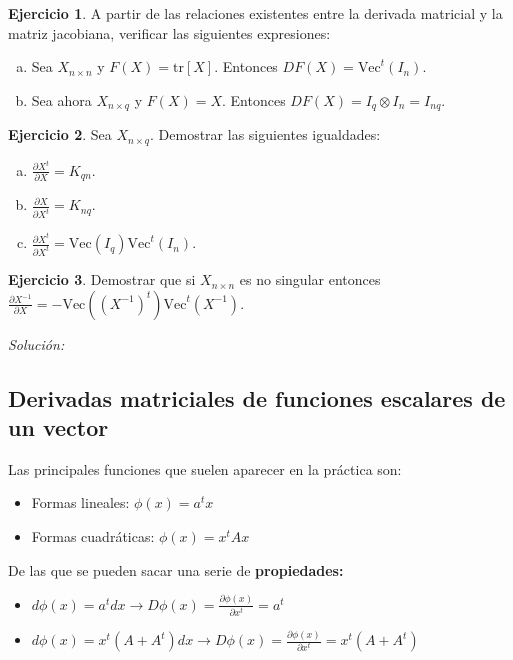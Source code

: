 \documentclass{article}
\theoremstyle{theorem-style}  %
\theoremstyle{definition}
\theoremstyle{example-style}
\newtheorem{exercise}{Ejercicio}[section]
\begin{document}
\begin{exercise}
	A partir de las relaciones existentes entre la derivada matricial y la matriz jacobiana, verificar las siguientes expresiones:
	\begin{enumerate}[a)]
		\item Sea $X_{n\times n}$ y $F(X) = \text{tr}[X].$ Entonces $DF(X) = \text{Vec}^t(I_n).$
		\item Sea ahora $X_{n\times q}$ y $F(X) =X$. Entonces $DF(X) = I_q \otimes I_n = I_{nq}$.
	\end{enumerate}
\end{exercise}

\begin{exercise}
	Sea $X_{n\times q}$. Demostrar las siguientes igualdades:
	\begin{enumerate}[a)]
		\item $\displaystyle \frac{\partial X^t}{\partial X} = K_{qn}$.
		\item $\displaystyle \frac{\partial X}{\partial X^t} = K_{nq}$.
		\item $\displaystyle \frac{\partial X^t}{\partial X^t} = \text{Vec}(I_q)\text{Vec}^t(I_n)$.
	\end{enumerate}
\end{exercise}

\begin{exercise}
	Demostrar que si $X_{n\times n}$ es no singular entonces $\displaystyle \frac{\partial X^{-1}}{\partial X} = -\text{Vec}((X^{-1})^t)\text{Vec}^t(X^{-1})$.
\end{exercise}
\textit{Solución:}

\subsection{Derivadas matriciales de funciones escalares de un vector}

Las principales funciones que suelen aparecer en la práctica son:

\begin{itemize}
	\item Formas lineales: $\phi(x)=a^tx$
	\item Formas cuadráticas: $\phi(x)=x^tAx$
\end{itemize}

De las que se pueden sacar una serie de \textbf{propiedades:}

\begin{itemize}
	\item $d\phi(x) = a^tdx \rightarrow D\phi(x) = \frac{\partial \phi(x)}{\partial x^t} = a^t$
	\item $d\phi(x) = x^t(A+A^t)dx \rightarrow D\phi(x) = \frac{\partial \phi(x)}{\partial x^t} = x^t(A+A^t)$
	
\end{itemize}
\end{document}
